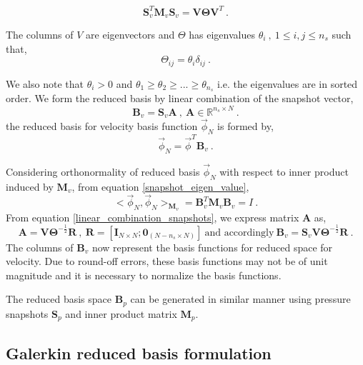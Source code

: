 \documentclass[graybox]{svmult}
\begin{document}
\begin{equation}\label{snapshot_eigen_value}
\bm{S}_v^T \bm{M}_v \bm{S}_v = \bm{V} \bm{\Theta} \bm{V}^T \ .
\end{equation}

The columns of $V$ are eigenvectors and $\Theta$ has eigenvalues $\theta_i \ , \ 1 \leq i,j \leq n_s$ such that,
\begin{equation}
\Theta_{ij} = \theta_i \delta_{ij} \ .
\end{equation}

We also note that $\theta_i > 0$ and $\theta_1 \geq \theta_2 \geq ... \geq \theta_{n_s}$ i.e. the eigenvalues are in sorted order. We form the reduced basis by linear combination of the snapshot vector,
\begin{equation}\label{linear_combination_snapshots}
\bm{B}_v = \bm{S}_v \bm{A} \ , \ \bm{A} \in \mathbb{R}^{n_s \times N} \ .
\end{equation}
the reduced basis for velocity basis function $\overrightarrow{\phi}_N$ is formed by,
\begin{equation}
\overrightarrow{\phi}_N = \overrightarrow{\phi}^T \bm{B}_v \ .
\end{equation}

Considering orthonormality of reduced basis $\overrightarrow{\phi}_N$ with respect to inner product induced by $\bm{M}_v$, from equation \eqref{snapshot_eigen_value},
\begin{equation}
<\overrightarrow{\phi}_N,\overrightarrow{\phi}_N>_{\bm{M}_v} = \bm{B}_v^T \bm{M}_v \bm{B}_v = I \ .
\end{equation}
From equation \eqref{linear_combination_snapshots}, we express matrix $\bm{A}$ as,
\begin{equation}
\bm{A} = \bm{V} \bm{\Theta}^{-\frac{1}{2}} \bm{R} \ , \ \bm{R} = [\bm{I}_{N \times N} ; \bm{0}_{(N-n_s \times N)}] \ \text{and accordingly} \ \bm{B}_v = \bm{S}_v \bm{V} \bm{\Theta}^{-\frac{1}{2}} \bm{R} \ .
\end{equation}
The columns of $\bm{B}_v$ now represent the basis functions for reduced space for velocity. Due to round-off errors, these basis functions may not be of unit magnitude and it is necessary to normalize the basis functions.

The reduced basis space $\bm{B}_p$ can be generated in similar manner using pressure snapshots $\bm{S}_p$ and inner product matrix $\bm{M}_p$.

\subsection{Galerkin reduced basis formulation}\label{Galerkin_section}
\end{document}
